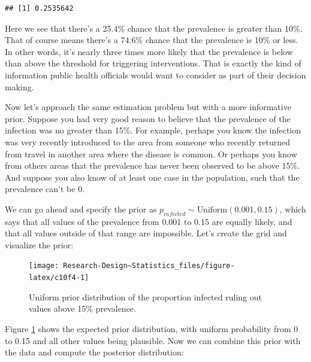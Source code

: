 \documentclass[
]{book}
\newenvironment{Shaded}{\begin{snugshade}}{\end{snugshade}}
\newcommand{\FloatTok}[1]{\textcolor[rgb]{0.00,0.00,0.81}{#1}}
\newcommand{\FunctionTok}[1]{\textcolor[rgb]{0.13,0.29,0.53}{\textbf{#1}}}
\newcommand{\NormalTok}[1]{#1}
\newcommand{\SpecialCharTok}[1]{\textcolor[rgb]{0.81,0.36,0.00}{\textbf{#1}}}
\begin{document}
\begin{Shaded}
\end{Shaded}

\begin{verbatim}
## [1] 0.2535642
\end{verbatim}

Here we see that there's a 25.4\% chance that the prevalence is greater than 10\%. That of course means there's a 74.6\% chance that the prevalence is 10\% or less. In other words, it's nearly three times more likely that the prevalence is below than above the threshold for triggering interventions. That is exactly the kind of information public health officials would want to consider as part of their decision making.

Now let's approach the same estimation problem but with a more informative prior. Suppose you had very good reason to believe that the prevalence of the infection was no greater than 15\%. For example, perhaps you know the infection was very recently introduced to the area from someone who recently returned from travel in another area where the disease is common. Or perhaps you know from others areas that the prevalence has never been observed to be above 15\%. And suppose you also know of at least one case in the population, such that the prevalence can't be 0.

We can go ahead and specify the prior as \(p_{infected}\sim \text{Uniform}(0.001, 0.15)\), which says that all values of the prevalence from 0.001 to 0.15 are equally likely, and that all values outside of that range are impossible. Let's create the grid and visualize the prior:

\begin{figure}

{\centering \texttt{[image: Research-Design---Statistics\_files/figure-latex/c10f4-1]} 

}

\caption{Uniform prior distribution of the proportion infected ruling out values above 15\% prevalence.}\label{fig:c10f4}
\end{figure}

Figure \ref{fig:c10f4} shows the expected prior distribution, with uniform probability from 0 to 0.15 and all other values being plausible. Now we can combine this prior with the data and compute the posterior distribution:
\end{document}
